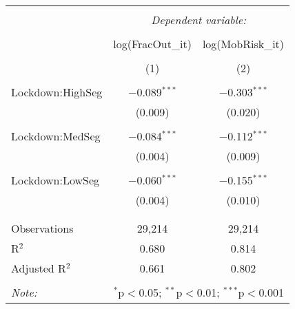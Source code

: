 \begin{tabular}{@{\extracolsep{5pt}}lcc} 
\\[-1.8ex]\hline 
\hline \\[-1.8ex] 
 & \multicolumn{2}{c}{\textit{Dependent variable:}} \\ 
\cline{2-3} 
\\[-1.8ex] & log(FracOut_{it}) & log(MobRisk_{it}) \\ 
\\[-1.8ex] & (1) & (2)\\ 
\hline \\[-1.8ex] 
 Lockdown:HighSeg & $-$0.089$^{***}$ & $-$0.303$^{***}$ \\ 
  & (0.009) & (0.020) \\ 
  & & \\ 
 Lockdown:MedSeg & $-$0.084$^{***}$ & $-$0.112$^{***}$ \\ 
  & (0.004) & (0.009) \\ 
  & & \\ 
 Lockdown:LowSeg & $-$0.060$^{***}$ & $-$0.155$^{***}$ \\ 
  & (0.004) & (0.010) \\ 
  & & \\ 
\hline \\[-1.8ex] 
Observations & 29,214 & 29,214 \\ 
R$^{2}$ & 0.680 & 0.814 \\ 
Adjusted R$^{2}$ & 0.661 & 0.802 \\ 
\hline 
\hline \\[-1.8ex] 
\textit{Note:}  & \multicolumn{2}{r}{$^{*}$p$<$0.05; $^{**}$p$<$0.01; $^{***}$p$<$0.001} \\ 
\end{tabular} 